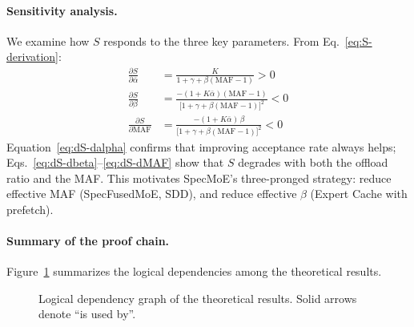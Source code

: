 \documentclass[letterpaper,twocolumn,10pt]{article}
\newcommand{\sysname}{SpecMoE\xspace}
\newcommand{\specfused}{SpecFusedMoE\xspace}
\newcommand{\sdd}{SDD\xspace}
\newcommand{\thetabar}{\bar{\alpha}}
\begin{document}
\begin{appendices}
\paragraph{Sensitivity analysis.}
We examine how $S$ responds to the three key parameters.  From
Eq.~\eqref{eq:S-derivation}:
\begin{align}
  \frac{\partial S}{\partial \thetabar} &=
    \frac{K}{1+\gamma+\beta(\text{MAF}-1)} > 0
    \label{eq:dS-dalpha}\\[4pt]
  \frac{\partial S}{\partial \beta} &=
    \frac{-(1+K\thetabar)(\text{MAF}-1)}
         {\bigl[1+\gamma+\beta(\text{MAF}-1)\bigr]^2} < 0
    \label{eq:dS-dbeta}\\[4pt]
  \frac{\partial S}{\partial \text{MAF}} &=
    \frac{-(1+K\thetabar)\,\beta}
         {\bigl[1+\gamma+\beta(\text{MAF}-1)\bigr]^2} < 0
    \label{eq:dS-dMAF}
\end{align}
Equation~\eqref{eq:dS-dalpha} confirms that improving acceptance rate
always helps; Eqs.~\eqref{eq:dS-dbeta}--\eqref{eq:dS-dMAF} show that
$S$ degrades with both the offload ratio and the MAF.  This motivates
\sysname's three-pronged strategy: reduce effective MAF (\specfused,
\sdd), and reduce effective $\beta$ (Expert Cache with prefetch).

\paragraph{Summary of the proof chain.}
Figure~\ref{fig:proof-chain} summarizes the logical dependencies among
the theoretical results.

\begin{figure}[h]
\centering
{}
\caption{Logical dependency graph of the theoretical results.  Solid
  arrows denote ``is used by''.}\label{fig:proof-chain}
\end{figure}

\end{appendices}

\end{document}
